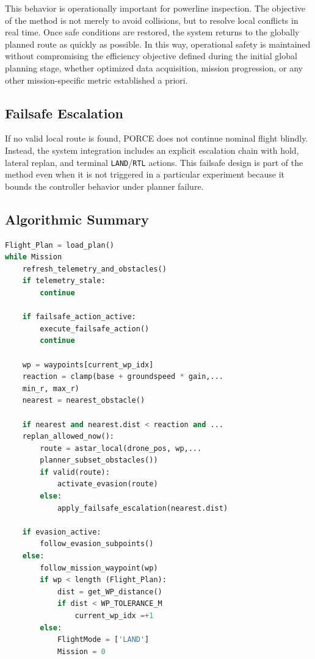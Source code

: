 \documentclass[journal,twoside,web]{ieeecolor}
\begin{document}
This behavior is operationally important for powerline inspection. The objective of the method is not merely to avoid collisions, but to resolve local conflicts in real time. Once safe conditions are restored, the system returns to the globally planned route as quickly as possible. In this way, operational safety is maintained without compromising the efficiency objective defined during the initial global planning stage, whether optimized data acquisition, mission progression, or any other mission-specific metric established a priori.


\subsection{Failsafe Escalation}

If no valid local route is found, PORCE does not continue nominal flight blindly. Instead, the system integration includes an explicit escalation chain with hold, lateral replan, and terminal \texttt{LAND}/\texttt{RTL} actions. This failsafe design is part of the method even when it is not triggered in a particular experiment because it bounds the controller behavior under planner failure.

\subsection{Algorithmic Summary}

\begin{lstlisting}[language=Python, caption=Simplified control loop for the proposed method]
Flight_Plan = load_plan()
while Mission
    refresh_telemetry_and_obstacles()
    if telemetry_stale:
        continue

    if failsafe_action_active:
        execute_failsafe_action()
        continue

    wp = waypoints[current_wp_idx]
    reaction = clamp(base + groundspeed * gain,...
    min_r, max_r)
    nearest = nearest_obstacle()

    if nearest and nearest.dist < reaction and ...
    replan_allowed_now():
        route = astar_local(drone_pos, wp,... 
        planner_subset_obstacles())
        if valid(route):
            activate_evasion(route)
        else:
            apply_failsafe_escalation(nearest.dist)

    if evasion_active:
        follow_evasion_subpoints()
    else:
        follow_mission_waypoint(wp)
        if wp < length (Flight_Plan): 
            dist = get_WP_distance()
            if dist < WP_TOLERANCE_M
                current_wp_idx =+1
        else: 
            FlightMode = ['LAND']
            Mission = 0

\end{lstlisting}
\end{document}

